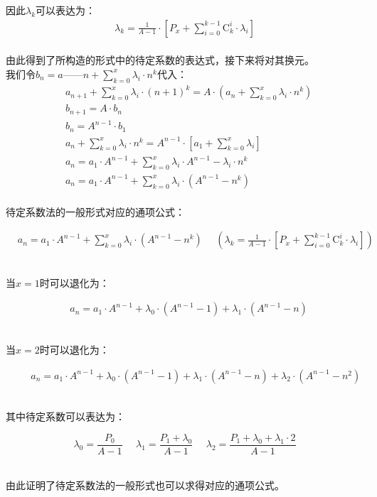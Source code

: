 \documentclass[UTF8]{ctexart}
\newcommand{\Co}{\mathrm{C}}
\begin{document}
\newpage

    因此$\lambda_k$可以表达为：
    \begin{align}
        \lambda_k=\frac{1}{A-1}\cdot\left[P_x+\sum_{i=0}^{k-1}\Co_k^i\cdot\lambda_i\right]
    \end{align}\\
    由此得到了所构造的形式中的待定系数的表达式，接下来将对其换元。\\[3mm]
    我们令$b_n=a——n+\sum\limits_{k=0}^x\lambda_i\cdot n^k$代入：
    \begin{align}
        &a_{n+1}+\sum_{k=0}^x\lambda_i\cdot(n+1)^k=A\cdot\left(a_n+\sum_{k=0}^x\lambda_i\cdot n^k\right)\\[3mm]
        &b_{n+1}=A\cdot b_{n}\\[6mm]
        &b_n=A^{n-1}\cdot b_1\\[3mm]
        &a_n+\sum_{k=0}^x\lambda_i\cdot n^k=A^{n-1}\cdot\left[a_1+\sum_{k=0}^x\lambda_i\right]\\[3mm]
        &a_n=a_1\cdot A^{n-1}+\sum_{k=0}^x\lambda_i\cdot A^{n-1}-\lambda_i\cdot n^k\\[3mm]
        &a_n=a_1\cdot A^{n-1}+\sum_{k=0}^x\lambda_i\cdot\left(A^{n-1}-n^k\right)
    \end{align}\\
    待定系数法的一般形式对应的通项公式：
    \begin{large}
        \begin{align*}
            &a_n=a_1\cdot A^{n-1}+\sum_{k=0}^x\lambda_i\cdot\left(A^{n-1}-n^k\right)~~~~~~\left(\lambda_k=\frac{1}{A-1}\cdot\left[P_x+\sum_{i=0}^{k-1}\Co_k^i\cdot\lambda_i\right]\right)
        \end{align*}
    \end{large}\\
    当$x=1$时可以退化为：
    \begin{large}
        \begin{align*}
            &a_n=a_1\cdot A^{n-1}+\lambda_0\cdot\left(A^{n-1}-1\right)+\lambda_1\cdot\left(A^{n-1}-n\right)
        \end{align*}
    \end{large}\\
    当$x=2$时可以退化为：
    \begin{large}
        \begin{align*}
            &~~~~~~a_n=a_1\cdot A^{n-1}+\lambda_0\cdot\left(A^{n-1}-1\right)+\lambda_1\cdot\left(A^{n-1}-n\right)+\lambda_2\cdot\left(A^{n-1}-n^2\right)
        \end{align*}
    \end{large}\\
    其中待定系数可以表达为：
    \begin{large}
        \begin{equation*}
            \lambda_0=\frac{P_0}{A-1}~~~~~~\lambda_1=\frac{P_1+\lambda_0}{A-1}~~~~~~\lambda_2=\frac{P_1+\lambda_0+\lambda_1\cdot 2}{A-1}
        \end{equation*}
    \end{large}\\
    由此证明了待定系数法的一般形式也可以求得对应的通项公式。
\end{document}
